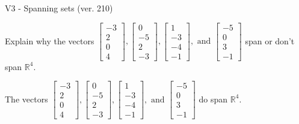 \begin{exercise}
  \begin{exerciseTitle}V3 - Spanning sets (ver. 210)\end{exerciseTitle}
  \begin{exerciseStatement}
    Explain why the vectors \(\left[\begin{array}{r}
-3 \\
2 \\
0 \\
4
\end{array}\right] , \left[\begin{array}{r}
0 \\
-5 \\
2 \\
-3
\end{array}\right] , \left[\begin{array}{r}
1 \\
-3 \\
-4 \\
-1
\end{array}\right] , \text{ and } \left[\begin{array}{r}
-5 \\
0 \\
3 \\
-1
\end{array}\right]\) span or don't span \(\mathbb{R}^4\). 
	


  \end{exerciseStatement}
  \begin{exerciseAnswer}
   The vectors \(\left[\begin{array}{r}
-3 \\
2 \\
0 \\
4
\end{array}\right] , \left[\begin{array}{r}
0 \\
-5 \\
2 \\
-3
\end{array}\right] , \left[\begin{array}{r}
1 \\
-3 \\
-4 \\
-1
\end{array}\right] , \text{ and } \left[\begin{array}{r}
-5 \\
0 \\
3 \\
-1
\end{array}\right]\) 
  	 do  
	span \(\mathbb{R}^4\).
  


  \end{exerciseAnswer}
\end{exercise}